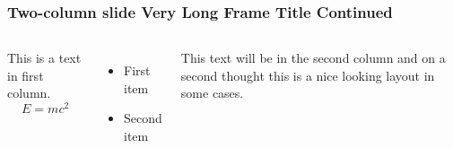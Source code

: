 \documentclass[aspectratio=1610]{beamer}
\begin{document}
\begin{frame}
\frametitle{Two-column slide Very Long Frame Title Continued}
\begin{columns}

This is a text in first column.
$$E=mc^2$$
\begin{itemize}
\item First item
\item Second item
\end{itemize}

This text will be in the second column
and on a second thought this is a nice looking
layout in some cases.
\end{columns}
\end{frame}
\end{document}
